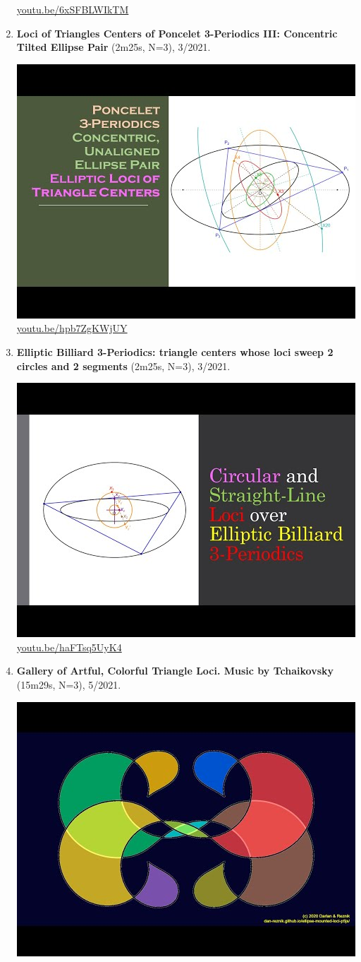 \documentclass[12pt]{amsart}
\begin{document}
\begin{enumerate}[resume]
\begin{center}
\href{https://youtu.be/6xSFBLWIkTM}{\url{youtu.be/6xSFBLWIkTM}}\end{center}
% 
\item \textbf{Loci of Triangles Centers of Poncelet 3-Periodics III: Concentric Tilted Ellipse Pair} (2m25s, N=3), 3/2021. 
\begin{center}\includegraphics[width=.5\textwidth]{pics/hpb7ZgKWjUY.jpg} \\ 
\href{https://youtu.be/hpb7ZgKWjUY}{\url{youtu.be/hpb7ZgKWjUY}}\end{center}
% 
\item \textbf{Elliptic Billiard 3-Periodics: triangle centers whose loci sweep 2 circles and 2 segments} (2m25s, N=3), 3/2021. 
\begin{center}\includegraphics[width=.5\textwidth]{pics/haFTsq5UyK4.jpg} \\ 
\href{https://youtu.be/haFTsq5UyK4}{\url{youtu.be/haFTsq5UyK4}}\end{center}
% 
\item \textbf{Gallery of Artful, Colorful Triangle Loci. Music by Tchaikovsky} (15m29s, N=3), 5/2021. 
\begin{center}\includegraphics[width=.5\textwidth]{pics/l-O5UT8tpuw.jpg} \\ 

\end{center}
\end{enumerate}
\end{document}
